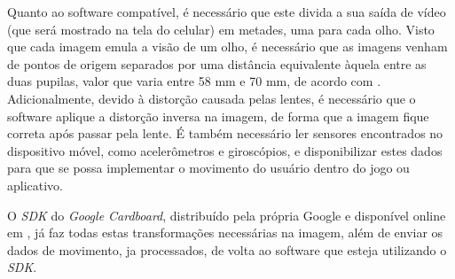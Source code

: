 Quanto ao software compatível, é necessário que este divida a sua saída de 
vídeo (que será mostrado na tela do celular) em metades, uma para cada olho. 
Visto que cada imagem emula a visão de um olho, é necessário que as imagens 
venham de pontos de origem separados por uma distância equivalente àquela entre 
as duas pupilas, valor que varia entre 58 mm e 70 mm, de acordo com
\cite{dodgson:2004:svariation}. Adicionalmente, devido à distorção causada 
pelas lentes, é necessário que o software aplique a distorção inversa na imagem, 
de forma que a imagem fique correta após passar pela lente. É também necessário 
ler sensores encontrados no dispositivo móvel, como acelerômetros e giroscópios, 
e disponibilizar estes dados para que se possa implementar o movimento do 
usuário dentro do jogo ou aplicativo.

O \textit{SDK} do \textit{Google Cardboard}, distribuído pela própria Google e disponível online 
em \cite{google:2016:cardboardSDK}, já faz todas estas transformações necessárias 
na imagem, além de enviar os dados de movimento, ja processados, de volta ao
software que esteja utilizando o \textit{SDK}.
